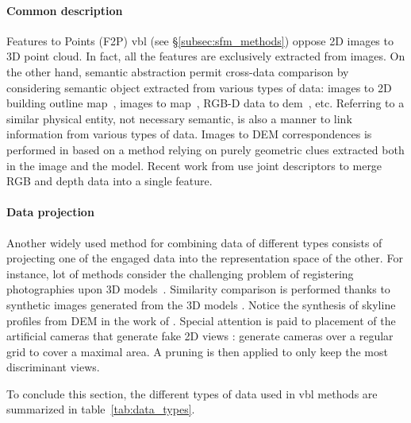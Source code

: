     	\paragraph{Common description}
    		Features to Points (F2P) \ac{vbl} (see \S\ref{subsec:sfm_methods}) oppose 2D images to 3D point cloud. In fact, all the features are exclusively extracted from images. On the other hand, semantic abstraction permit cross-data comparison by considering semantic object extracted from various types of data: images to 2D building outline map~\citep{Cham2010}, images to map~\citep{Ardeshir2014,Qu2015,Castaldo2015,Brubaker2016}, RGB-D data to \ac{dem}~\citep{Christie2016}, etc. Referring to a similar physical entity, not necessary semantic, is also a manner to link information from various types of data. Images to DEM correspondences is performed in \citep{Bansal2014} based on a method relying on purely geometric clues extracted both in the image and the model. Recent work from \citep{Sizikova2016,Li2017} use joint descriptors to merge RGB and depth data into a single feature.
					
		\paragraph{Data projection}
			Another widely used method for combining data of different types consists of projecting one of the engaged data into the representation space of the other. For instance, lot of methods consider the challenging problem of registering photographies upon 3D models~\citep{Baatz2012,Kendall2015,Arth2015,Pascoe2015,Pascoe2015a,Pascoe2015b}. Similarity comparison is performed thanks to synthetic images generated from the 3D models \citep{Russell2011,Mason2011,Aubry2014,Poglitsch2015}. Notice the synthesis of skyline profiles from DEM in the work of \citet{Baatz2012}. Special attention is paid to placement of the artificial cameras that generate fake 2D views \citep{Irschara2009,Gee2012,Torii2015}: \citet{Aubry2014} generate cameras over a regular grid to cover a maximal area. A pruning is then applied to only keep the most discriminant views.

To conclude this section, the different types of data used in \ac{vbl} methods are summarized in table~\ref{tab:data_types}.


